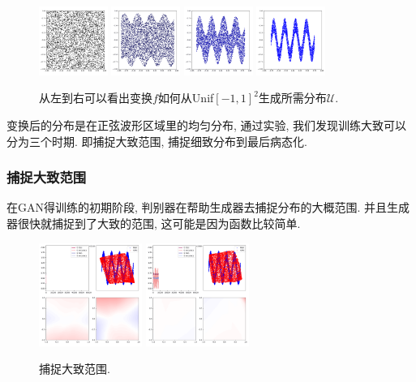 \documentclass[lang=cn,11pt]{elegantpaper}
\begin{document}
\begin{figure}[hbt]
\centering
  \includegraphics[width=0.2\textwidth]{sin_1_1}  
  \includegraphics[width=0.2\textwidth]{sin_1_2}
  \includegraphics[width=0.2\textwidth]{sin_1_3}
  \includegraphics[width=0.2\textwidth]{sin_1_4}
  \caption{从左到右可以看出变换$f$如何从Unif$[-1,1]^2$生成所需分布$\mathcal U$.}
\end{figure}

\noindent 变换后的分布是在正弦波形区域里的均匀分布, 通过实验, 我们发现训练大致可以分为三个时期. 即捕捉大致范围, 捕捉细致分布到最后病态化.

\subsubsection{捕捉大致范围}
在GAN得训练的初期阶段, 判别器在帮助生成器去捕捉分布的大概范围. 并且生成器很快就捕捉到了大致的范围, 这可能是因为函数比较简单.

\begin{figure}[htbp]
\centering
  \includegraphics[width=0.3\textwidth]{sin_2_1}
  \includegraphics[width=0.3\textwidth]{sin_2_2}
  \caption{捕捉大致范围.}
\end{figure}
\end{document}
